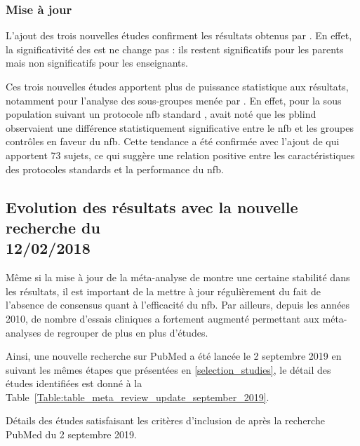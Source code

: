 \subsubsection{Mise à jour}

L'ajout des trois nouvelles études \citep{Baumeister2016, Strehl2017, Bazanova2018} confirment les résultats obtenus par \citep{Cortese2016}. En effet,
la significativité des \gls{est} ne change pas : ils restent significatifs pour les parents mais non significatifs pour les enseignants. 

Ces trois nouvelles études apportent plus de puissance statistique aux résultats, notamment pour l'analyse des sous-groupes menée par \citet{Cortese2016}.
En effet, pour la sous population suivant un protocole \gls{nfb} standard \citep{Arns2014}, \citet{Cortese2016} avait noté que les \gls{pblind} observaient
une différence statistiquement significative entre le \gls{nfb} et les groupes contrôles en faveur du \gls{nfb}. Cette tendance a été confirmée avec l'ajout 
de \citet{Baumeister2016, Strehl2017} qui apportent 73 sujets, ce qui suggère une relation positive entre les caractéristiques des protocoles standards
et la performance du \gls{nfb}. 

\subsection{Evolution des résultats avec la nouvelle recherche du \\ 12/02/2018}

Même si la mise à jour de la méta-analyse de \citet{Cortese2016} montre une certaine stabilité dans les résultats, il est important de la mettre à jour
régulièrement du fait de l'absence de consensus quant à l'efficacité du \gls{nfb}. Par ailleurs, depuis les années 2010, de nombre d'essais cliniques 
a fortement augmenté permettant aux méta-analyses de regrouper de plus en plus d'études. %

Ainsi, une nouvelle recherche sur PubMed a été lancée le 2 septembre 2019 en suivant les mêmes étapes que présentées en \ref{selection_studies}, le détail
des études identifiées est donné à la Table~\ref{Table:table_meta_review_update_september_2019}.

\begin{table}[h!]
  \centering
  \caption{Détails des études satisfaisant les critères d'inclusion de \citep{Cortese2016} après la recherche PubMed du 2 septembre 2019.}
  
  \label{Table:table_meta_review_update_september_2019}
\end{table} 

